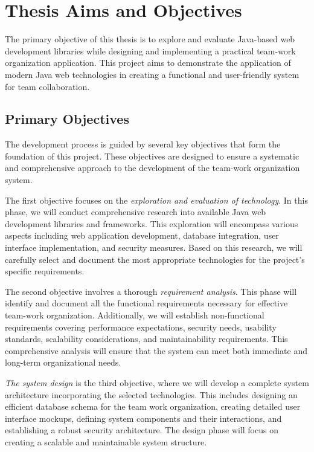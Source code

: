 \section{Thesis Aims and Objectives}\label{sec:thesis-aims}
The primary objective of this thesis is to explore and evaluate Java-based web development libraries while designing and implementing a practical team-work organization application.
This project aims to demonstrate the application of modern Java web technologies in creating a functional and user-friendly system for team collaboration.

\subsection{Primary Objectives}\label{subsec:primary-objectives}
The development process is guided by several key objectives that form the foundation of this project.
These objectives are designed to ensure a systematic and comprehensive approach to the development of the team-work organization system.

The first objective focuses on the \textit{exploration and evaluation of technology}.
In this phase, we will conduct comprehensive research into available Java web development libraries and frameworks.
This exploration will encompass various aspects including web application development, database integration, user interface implementation, and security measures.
Based on this research, we will carefully select and document the most appropriate technologies for the project's specific requirements.

The second objective involves a thorough \textit{requirement analysis}.
This phase will identify and document all the functional requirements necessary for effective team-work organization.
Additionally, we will establish non-functional requirements covering performance expectations, security needs, usability standards, scalability considerations, and maintainability requirements.
This comprehensive analysis will ensure that the system can meet both immediate and long-term organizational needs.

\textit{The system design} is the third objective, where we will develop a complete system architecture incorporating the selected technologies.
This includes designing an efficient database schema for the team work organization, creating detailed user interface mockups, defining system components and their interactions, and establishing a robust security architecture.
The design phase will focus on creating a scalable and maintainable system structure.

